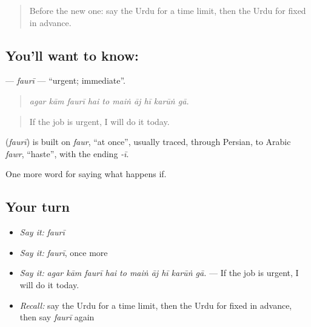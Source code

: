 \label{lesson:UR-C526-fauri}



\begin{quote}
Before the new one: say the Urdu for a time limit, then the Urdu for fixed in advance.
\end{quote}

\subsection*{You'll want to know: }
\textbf{} — \emph{faurī} — \textquotedblleft{}urgent; immediate\textquotedblright{}.

\begin{quote}
         
\end{quote}

\begin{quote}
\emph{agar kām faurī hai to maiṅ āj hī karūṅ gā.}
\end{quote}

\begin{quote}
If the job is urgent, I will do it today.
\end{quote}

\begin{cousinweb}
\textbf{} (\emph{faurī}) is built on \emph{faur}, \textquotedblleft{}at once\textquotedblright{}, usually traced, through Persian, to Arabic \emph{fawr}, \textquotedblleft{}haste\textquotedblright{}, with the ending \emph{-ī}.
\end{cousinweb}

\begin{grammarlens}[title={What you've built}]
One more word for saying what happens if.
\end{grammarlens}

\subsection*{Your turn}
\begin{itemize}
\raggedright
  \item \emph{Say it:} \emph{faurī}
  \item \emph{Say it:} \emph{faurī}, once more
  \item \emph{Say it:} \emph{agar kām faurī hai to maiṅ āj hī karūṅ gā.} — If the job is urgent, I will do it today.
  \item \emph{Recall:} say the Urdu for a time limit, then the Urdu for fixed in advance, then say \emph{faurī} again
\end{itemize}

